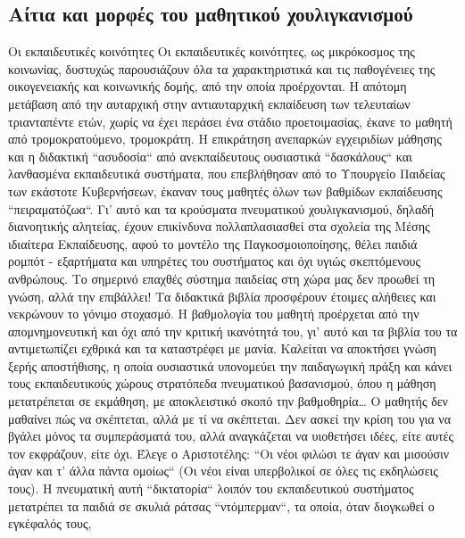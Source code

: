 \documentclass[12pt,a4paper]{book}
\begin{document}
\subsection*{Αίτια και μορφές του μαθητικού χουλιγκανισμού}
\setlength{\parindent}{20pt}\indent Οι εκπαιδευτικές κοινότητες
Οι εκπαιδευτικές κοινότητες, ως μικρόκοσμος της κοινωνίας, δυστυχώς παρουσιάζουν
όλα τα χαρακτηριστικά και τις παθογένειες της οικογενειακής και κοινωνικής
δομής, από την οποία προέρχονται. Η απότομη μετάβαση από την αυταρχική στην
αντιαυταρχική εκπαίδευση των τελευταίων τριανταπέντε ετών, χωρίς να έχει περάσει
ένα στάδιο προετοιμασίας, έκανε το μαθητή από  τρομοκρατούμενο, τρομοκράτη. Η
επικράτηση ανεπαρκών εγχειριδίων μάθησης και η διδακτική ``ασυδοσία`` από
ανεκπαίδευτους ουσιαστικά ``δασκάλους`` και λανθασμένα εκπαιδευτικά συστήματα,
που επεβλήθησαν από το Υπουργείο Παιδείας των εκάστοτε Κυβερνήσεων, έκαναν τους
μαθητές όλων των βαθμίδων εκπαίδευσης ``πειραματόζωα``. Γι' αυτό και τα
κρούσματα πνευματικού χουλιγκανισμού, δηλαδή διανοητικής αλητείας, έχουν
επικίνδυνα πολλαπλασιασθεί στα σχολεία της Μέσης ιδιαίτερα Εκπαίδευσης, αφού το
μοντέλο της Παγκοσμοιοποίησης, θέλει παιδιά ρομπότ - εξαρτήματα και υπηρέτες του
συστήματος και όχι υγιώς σκεπτόμενους ανθρώπους.
\newline\setlength{\parindent}{20pt}\indent Το σημερινό επαχθές σύστημα
παιδείας στη χώρα μας δεν προωθεί τη γνώση, αλλά την επιβάλλει! Τα διδακτικά βιβλία
προσφέρουν έτοιμες αλήθειες και νεκρώνουν το γόνιμο στοχασμό. Η βαθμολογία του
μαθητή προέρχεται από την απομνημονευτική και όχι από την κριτική ικανότητά του,
γι' αυτό και τα βιβλία του τα αντιμετωπίζει εχθρικά και τα καταστρέφει με μανία.
Καλείται να αποκτήσει γνώση ξερής αποστήθισης, η οποία ουσιαστικά υπονομεύει την
παιδαγωγική πράξη και κάνει τους εκπαιδευτικούς χώρους στρατόπεδα πνευματικού
βασανισμού, όπου η μάθηση μετατρέπεται σε εκμάθηση, με αποκλειστικό σκοπό την
βαθμοθηρία\ldots\vspace{6 mm} Ο μαθητής δεν μαθαίνει πώς να σκέπτεται, αλλά με
τί να σκέπτεται. Δεν ασκεί την κρίση του για να βγάλει μόνος τα συμπεράσματά
του, αλλά αναγκάζεται να υιοθετήσει ιδέες, είτε αυτές τον εκφράζουν, είτε
όχι.
\newline\setlength{\parindent}{20pt}\indent Έλεγε ο Αριστοτέλης: ``Οι νέοι φιλώσι τε άγαν και μισούσιν άγαν και τ' άλλα πάντα
ομοίως`` (Οι νέοι είναι υπερβολικοί σε όλες τις εκδηλώσεις τους). Η πνευματική
αυτή ``δικτατορία`` λοιπόν του εκπαιδευτικού συστήματος μετατρέπει τα παιδιά σε
σκυλιά ράτσας ``ντόμπερμαν``, τα οποία, όταν διογκωθεί ο εγκέφαλός τους,
\end{document}
